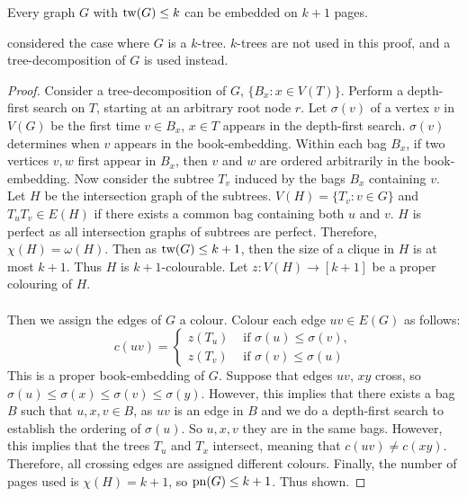 \begin{theorem}\label{thm:bded_treewidth_bded_pagenumber}
	Every graph \(G\) with \(\operatorname{tw}(G) \leq k\) can be embedded on $k + 1$ pages.
\end{theorem}
\textcite{ganleyPagenumberTrees2001} considered the case where \(G\) is a \(k\)-tree. $k$-trees are not used in this proof, and a tree-decomposition of \(G\) is used instead. 

\begin{proof}
	Consider a tree-decomposition of \(G\), $\{B_x: x \in V(T)\}$. Perform a depth-first search on \(T\), starting at an arbitrary root node \(r\). Let \(\sigma(v)\) of a vertex \(v\) in \(V(G)\) be the first time \(v \in B_x\), $x \in T$ appears in the depth-first search. $\sigma(v)$ determines when $v$ appears in the book-embedding. Within each bag $B_x$, if two vertices $v,w$ first appear in $B_x$, then $v$ and $w$ are ordered arbitrarily in the book-embedding. Now consider the subtree \(T_v\) induced by the bags \(B_x\) containing \(v\). Let \(H\) be the intersection graph of the subtrees. \(V(H) = \lbrace T_v : v \in G \rbrace\) and \(T_u T_v \in E(H)\) if there exists a common bag containing both $u$ and $v$. \(H\) is perfect as all intersection graphs of subtrees are perfect. Therefore, \(\chi(H) = \omega(H)\). Then as \(\operatorname{tw}(G) \leq k + 1\), then the size of a clique in \(H\) is at most \(k + 1\). Thus \(H\) is \(k + 1\)-colourable. Let $z: V(H) \rightarrow [k + 1]$ be a proper colouring of $H$. 
	\paragraph{}
	Then we assign the edges of \(G\) a colour. Colour each edge \(uv \in E(G)\) as follows:
	\begin{equation}
		c(uv) =
		\begin{cases}
			z(T_u) & \text{ if } \sigma(u) \leq \sigma(v), \\
			z(T_v) & \text{ if } \sigma(v) \leq \sigma(u)
		\end{cases}
	\end{equation}
	This is a proper book-embedding of \(G\). Suppose that edges \(uv\), \(xy\) cross, so \(\sigma(u) \leq \sigma(x) \leq \sigma(v) \leq \sigma(y)\). However, this implies that there exists a bag \(B\) such that \(u, x, v \in B\), as \(uv\) is an edge in \(B\) and we do a depth-first search to establish the ordering of $\sigma(u)$. So \(u, x, v\) they are in the same bags. However, this implies that the trees \(T_u\) and \(T_x\) intersect, meaning that \(c(uv) \neq c(xy)\). Therefore, all crossing edges are assigned different colours. Finally, the number of pages used is \(\chi(H) = k + 1\), so \(\operatorname{pn}(G) \leq k + 1\). Thus shown.
\end{proof}
